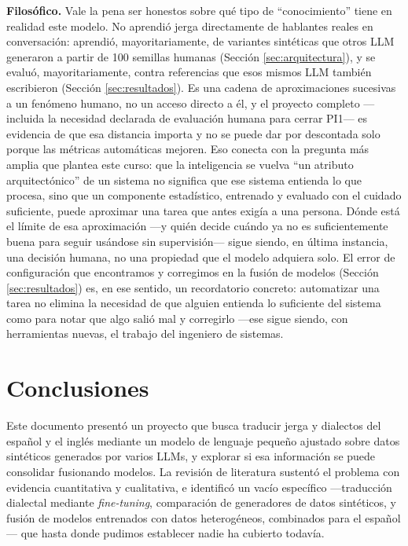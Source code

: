 \documentclass[11pt,a4paper]{article}
\begin{document}
\textbf{Filosófico.} Vale la pena ser honestos sobre qué tipo de ``conocimiento'' tiene en realidad este modelo. No aprendió jerga directamente de hablantes reales en conversación: aprendió, mayoritariamente, de variantes sintéticas que otros LLM generaron a partir de 100 semillas humanas (Sección \ref{sec:arquitectura}), y se evaluó, mayoritariamente, contra referencias que esos mismos LLM también escribieron (Sección \ref{sec:resultados}). Es una cadena de aproximaciones sucesivas a un fenómeno humano, no un acceso directo a él, y el proyecto completo —incluida la necesidad declarada de evaluación humana para cerrar PI1— es evidencia de que esa distancia importa y no se puede dar por descontada solo porque las métricas automáticas mejoren. Eso conecta con la pregunta más amplia que plantea este curso: que la inteligencia se vuelva ``un atributo arquitectónico'' de un sistema no significa que ese sistema entienda lo que procesa, sino que un componente estadístico, entrenado y evaluado con el cuidado suficiente, puede aproximar una tarea que antes exigía a una persona. Dónde está el límite de esa aproximación —y quién decide cuándo ya no es suficientemente buena para seguir usándose sin supervisión— sigue siendo, en última instancia, una decisión humana, no una propiedad que el modelo adquiera solo. El error de configuración que encontramos y corregimos en la fusión de modelos (Sección \ref{sec:resultados}) es, en ese sentido, un recordatorio concreto: automatizar una tarea no elimina la necesidad de que alguien entienda lo suficiente del sistema como para notar que algo salió mal y corregirlo —ese sigue siendo, con herramientas nuevas, el trabajo del ingeniero de sistemas.

\section{Conclusiones}
\label{sec:conclusiones}

Este documento presentó un proyecto que busca traducir jerga y dialectos del español y el inglés mediante un modelo de lenguaje pequeño ajustado sobre datos sintéticos generados por varios LLMs, y explorar si esa información se puede consolidar fusionando modelos. La revisión de literatura sustentó el problema con evidencia cuantitativa y cualitativa, e identificó un vacío específico —traducción dialectal mediante \textit{fine-tuning}, comparación de generadores de datos sintéticos, y fusión de modelos entrenados con datos heterogéneos, combinados para el español— que hasta donde pudimos establecer nadie ha cubierto todavía.
\end{document}
